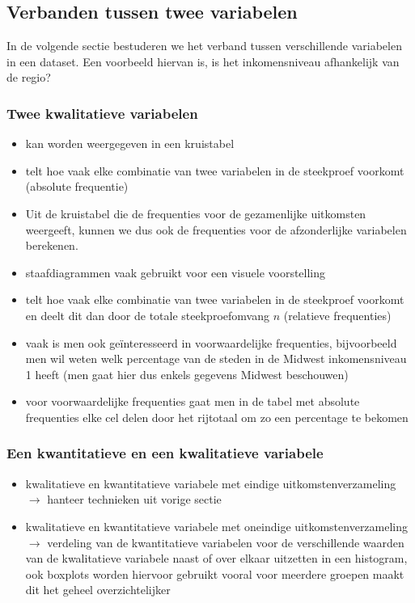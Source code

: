 \documentclass[titlepage]{article}
\numberwithin{equation}{section}
\begin{document}
 \subsection{Verbanden tussen twee variabelen}
 In de volgende sectie bestuderen we het verband tussen verschillende variabelen in een dataset. Een voorbeeld hiervan is, is het inkomensniveau afhankelijk van de regio?
 \subsubsection{Twee kwalitatieve variabelen}
 \begin{itemize}
 	\item kan worden weergegeven in een kruistabel
 	\item telt hoe vaak elke combinatie van twee variabelen in de steekproef voorkomt (absolute frequentie)
 	\item Uit de kruistabel die de frequenties voor de gezamenlijke uitkomsten weergeeft, kunnen we dus ook de frequenties voor de afzonderlijke variabelen berekenen.
 	\item staafdiagrammen vaak gebruikt voor een visuele voorstelling
 	\item telt hoe vaak elke combinatie van twee variabelen in de steekproef voorkomt en deelt dit dan door de totale steekproefomvang $n$ (relatieve frequenties)
 	\item vaak is men ook geïnteresseerd in voorwaardelijke frequenties, bijvoorbeeld men wil weten welk percentage van de steden in de Midwest inkomensniveau 1 heeft (men gaat hier dus enkels gegevens Midwest beschouwen)
 	\item voor voorwaardelijke frequenties gaat men in de tabel met absolute frequenties elke cel delen door het rijtotaal om zo een percentage te bekomen
 \end{itemize}
 \subsubsection{Een kwantitatieve en een kwalitatieve variabele}
 \begin{itemize}
 	\item kwalitatieve en kwantitatieve variabele met eindige uitkomstenverzameling $\rightarrow$ hanteer technieken uit vorige sectie
 	\item kwalitatieve en kwantitatieve variabele met oneindige uitkomstenverzameling $\rightarrow$ verdeling van de kwantitatieve variabelen voor de verschillende waarden van de kwalitatieve variabele naast of over elkaar uitzetten in een histogram, ook boxplots worden hiervoor gebruikt vooral voor meerdere groepen maakt dit het geheel overzichtelijker
 \end{itemize}
\end{document}
